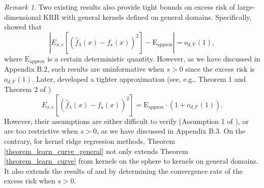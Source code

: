 \documentclass{article}
\theoremstyle{plain}
\theoremstyle{definition}
\theoremstyle{remark}
\newtheorem{remark}[theorem]{Remark}
\begin{document}
\begin{remark}\label{remark_compare_with_mei_mis}
Two existing results \citep{mei2022generalization, misiakiewicz2024non} also provide tight bounds on excess risk of large-dimensional KRR with general kernels defined on general domains. 
Specifically, \cite{mei2022generalization} showed that 
    \begin{equation*}
    \left|E_{x, \epsilon} \left[ \left(\hat{f}_{\lambda}(x) - f_{\star}(x) \right)^{2} \right]-
    \text{E}_{\text{approx}}
    \right| =o_{d, \mathbb{P}}\left(1\right),
\end{equation*}
where $\text{E}_{\text{approx}}$ is a certain deterministic quantity. However, as we have discussed in Appendix B.2, such results are uninformative when $s>0$ since the excess risk is $o_{d, \mathbb{P}}(1)$.
Later, \cite{misiakiewicz2024non} developed a tighter approximation (see, e.g., Theorem 1 and Theorem 2 of \cite{misiakiewicz2024non})
    \begin{equation*}
    E_{x, \epsilon} \left[ \left(\hat{f}_{\lambda}(x) - f_{\star}(x) \right)^{2} \right] = \text{E}_{\text{approx}} \cdot \left(1 + o_{d, \mathbb{P}}\left(1\right)\right).
\end{equation*}
    However, their assumptions are either difficult to verify (Assumption 1 of \cite{misiakiewicz2024non}), or are too restrictive when $s>0$, as we have discussed in Appendix B.3.
On the contrary, for kernel ridge regression methods, Theorem \ref{theorem_learn_curve_general} not only extends Theorem \ref{theorem_learn_curve} from kernels on the sphere to kernels on general domains. It also extends the results of \citet{mei2022generalization} and \citet{misiakiewicz2024non} by determining the convergence rate of the excess risk when $s>0$.
\end{remark}
\end{document}
